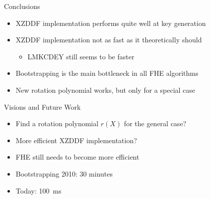 \documentclass[aspectratio=169]{beamer}
\begin{document}
\begin{frame}{Conclusions}
    \begin{itemize}
        \item XZDDF implementation performs quite well at key generation
    \end{itemize}
    \begin{itemize}
        \item XZDDF implementation not as fast as it theoretically should
        \begin{itemize}
            \item LMKCDEY still seems to be faster
        \end{itemize}
    \end{itemize}
    \begin{itemize}
        \item Bootstrapping is the main bottleneck in all FHE algorithms
    \end{itemize}
    \begin{itemize}
        \item New rotation polynomial works, but only for a special case
    \end{itemize}    
\end{frame}

\begin{frame}{Visions and Future Work}
    \begin{itemize}
        \item Find a rotation polynomial $r(X)$ for the general case?
    \end{itemize}    
    \begin{itemize}
        \item More efficient XZDDF implementation?
    \end{itemize}    
    \begin{itemize}
        \item FHE still needs to become more efficient
    \end{itemize}
    \begin{itemize}
        \item Bootstrapping 2010: 30 minutes
        \item Today: 100~ms
    \end{itemize}    
\end{frame}
\end{document}
